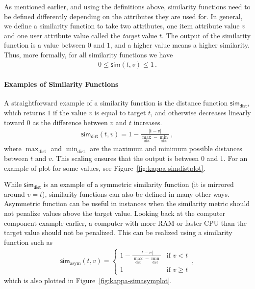 As mentioned earlier, and using the definitions above, similarity functions need to be defined  differently depending on the attributes they are used for.
In general, we define a similarity function to take two attributes, one item attribute value $v$ and one user attribute value called the \emph{target} value $t$.
The output of the similarity function is a value between $0$ and $1$, and a higher value means a higher similarity.
Thus, more formally, for all similarity functions we have
\begin{align}
	0 \le \mathsf{sim}(t, v) \le 1 \,.
\end{align}

\paragraph{Examples of Similarity Functions}
A straightforward example of a similarity function is the distance function $\mathsf{sim_\text{dist}}$, which returns $1$ if the value $v$ is equal to target $t$, and otherwise decreases linearly toward $0$ as the difference between $v$ and $t$ increases.
\begin{align}
	\mathsf{sim_\text{dist}}(t, v) = 1 - \frac{|t - v|}{\max_\text{dist} - \min_\text{dist}} \,,
\end{align}
where $\max_\text{dist}$ and $\min_\text{dist}$ are the maximum and minimum possible distances between $t$ and $v$.
This scaling ensures that the output is between $0$ and $1$.
For an example of plot for some values, see Figure~\ref{fig:kappa-simdistplot}.

While $\mathsf{sim_\text{dist}}$ is an example of a symmetric similarity function (it is mirrored around $v=t$), similarity functions can also be defined in many other ways.
Asymmetric function can be useful in instances when the similarity metric should not penalize values above the target value.
Looking back at the computer component example earlier, a computer with more RAM or faster CPU than the target value should not be penalized.
This can be realized using a similarity function such as
\begin{align}
	\mathsf{sim}_\text{asym}(t, v) =
	\begin{cases}
		1 - \frac{|t - v|}{\max_\text{dist} - \min_\text{dist}} & \text{if } v < t \\
		1                                                       & \text{if } v \ge t
	\end{cases} \,,
\end{align}
which is also plotted in Figure~\ref{fig:kappa-simasymplot}.

